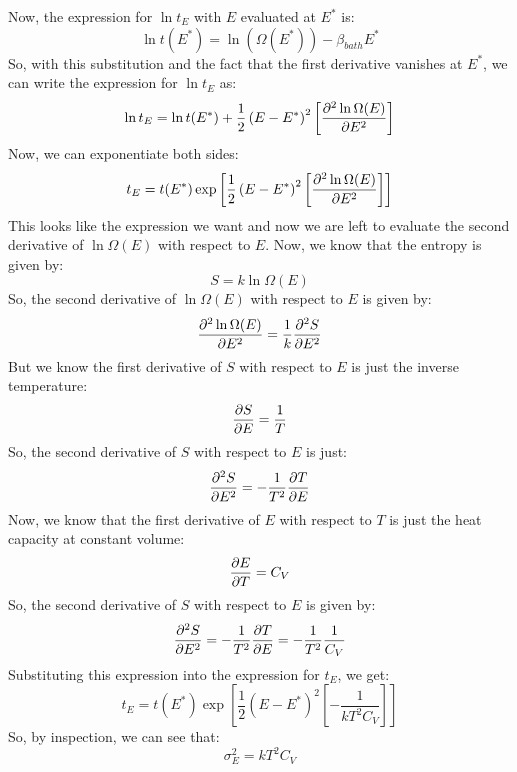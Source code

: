 \documentclass[10pt]{article}
\begin{document}
Now, the expression for $\ln t_{E}$ with $E$ evaluated at $E^{*}$ is:
\begin{equation}
  \ln t(E^{*}) = \ln \left( \Omega(E^{*}) \right) - \beta_{bath} E^{*}
\end{equation}
So, with this substitution and the fact that the first derivative vanishes at $E^*$, we can write the expression for $\ln t_{E}$ as:
\begin{equation}
  \ln t_{E} = \ln t(E^{*}) + \frac{1}{2} \left( E - E^{*} \right)^{2} \left[ \pdv[2]{\ln \Omega(E)}{E} \right]
\end{equation}
Now, we can exponentiate both sides:
\begin{equation}
  t_{E} = t(E^{*}) \exp \left[ \frac{1}{2} \left( E - E^{*} \right)^{2} \left[ \pdv[2]{\ln \Omega(E)}{E} \right] \right]
\end{equation}
This looks like the expression we want and now we are left to evaluate the second derivative of $\ln \Omega(E)$ with respect to $E$. Now, we know that the entropy is given by:
\begin{equation}
  S = k \ln \Omega(E)
\end{equation}
So, the second derivative of $\ln \Omega(E)$ with respect to $E$ is given by:
\begin{equation}
  \pdv[2]{\ln \Omega(E)}{E} = \frac{1}{k} \pdv[2]{S}{E}
\end{equation}
But we know the first derivative of $S$ with respect to $E$ is just the inverse temperature:
\begin{equation}
  \pdv{S}{E} = \frac{1}{T}
\end{equation}
So, the second derivative of $S$ with respect to $E$ is just:
\begin{equation}
  \pdv[2]{S}{E} = - \frac{1}{T^{2}} \pdv{T}{E}
\end{equation}
Now, we know that the first derivative of $E$ with respect to $T$ is just the heat capacity at constant volume:
\begin{equation}
  \pdv{E}{T} = C_{V}
\end{equation}
So, the second derivative of $S$ with respect to $E$ is given by:
\begin{equation}
  \pdv[2]{S}{E} = - \frac{1}{T^{2}} \pdv{T}{E} = - \frac{1}{T^{2}} \frac{1}{C_{V}}
\end{equation}
Substituting this expression into the expression for $t_{E}$, we get:
\begin{equation}
  t_{E} = t(E^{*}) \exp \left[ \frac{1}{2} \left( E - E^{*} \right)^{2} \left[ - \frac{1}{kT^{2} C_{V}} \right] \right]
\end{equation}
So, by inspection, we can see that:
\begin{equation}
  \sigma_{E}^{2} = kT^{2} C_{V}
\end{equation}
\end{document}
